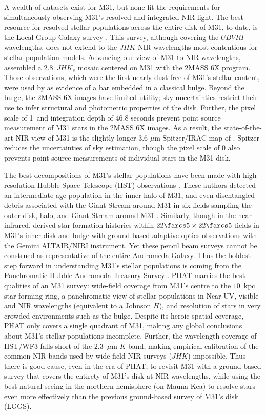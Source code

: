 \documentclass[iop]{emulateapj}
\begin{document}
A wealth of datasets exist for M31, but none fit the requirements for simultaneously observing M31's resolved and integrated NIR light.
The best resource for resolved stellar populations across the entire disk of M31, to date, is the Local Group Galaxy survey \cite[LGGS,][]{Williams:2003,Massey:2006}.
This survey, although covering the $UBVRI$ wavelengths, does not extend to the $JHK$ NIR wavelengths most contentious for stellar population models.
Advancing our view of M31 to NIR wavelengths, \cite{Beaton:2007} assembled a 2.8\arcdeg\ $JHK_s$ mosaic centered on M31 with the 2MASS 6X program.
Those observations, which were the first nearly dust-free of M31's stellar content, were used by \cite{Athanassoula:2006} as evidence of a bar embedded in a classical bulge.
Beyond the bulge, the 2MASS 6X images have limited utility; sky uncertainties restrict their use to infer structural and photometric properties of the disk.
Further, the pixel scale of 1\arcsec\ and integration depth of 46.8 seconds prevent point source measurement of M31 stars in the 2MASS 6X images.
As a result, the state-of-the-art NIR view of M31 is the slightly longer 3.6 $\mu$m Spitzer/IRAC map of \cite{Barmby:2006}.
Spitzer reduces the uncertainties of sky estimation, though the pixel scale of 0 also prevents point source measurements of individual stars in the M31 disk.

The best decompositions of M31's stellar populations have been made with high-resolution Hubble Space Telescope (HST) observations \citep{Brown:2003,Brown:2006,Brown:2008}.
These authors detected an intermediate age population in the inner halo of M31, and even disentangled debris associated with the Giant Stream around M31 in six fields sampling the outer disk, halo, and Giant Stream around M31 \citep{Brown:2009a}.
Similarly, though in the near-infrared, \cite{Olsen:2006} derived star formation histories within $22\farcs5\times22\farcs5$ fields in M31's inner disk and bulge with ground-based adaptive optics observations with the Gemini ALTAIR/NIRI instrument.
Yet these pencil beam surveys cannot be construed as representative of the entire Andromeda Galaxy.
Thus the boldest step forward in understanding M31's stellar populations is coming from the Panchromatic Hubble Andromeda Treasury Survey \citep[PHAT,][]{Dalcanton:2012}.
PHAT marries the best qualities of an M31 survey: wide-field coverage from M31's centre to the $10$~kpc star forming ring, a panchromatic view of stellar populations in Near-UV, visible and NIR wavelengths (equivalent to a Johnson $H$), and resolution of stars in very crowded environments such as the bulge.
Despite its heroic spatial coverage, PHAT only covers a single quadrant of M31, making any global conclusions about M31's stellar populations incomplete.
Further, the wavelength coverage of HST/WF3 falls short of the $2.3$~$\mu$m $K$-band, making empirical calibration of the common NIR bands used by wide-field NIR surveys ($JHK$) impossible.
Thus there is good cause, even in the era of PHAT, to revisit M31 with a ground-based survey that covers the entirety of M31's disk at NIR wavelengths, while using the best natural seeing in the northern hemisphere (on Mauna Kea) to resolve stars even more effectively than the previous ground-based survey of M31's disk (LGGS).
\end{document}
